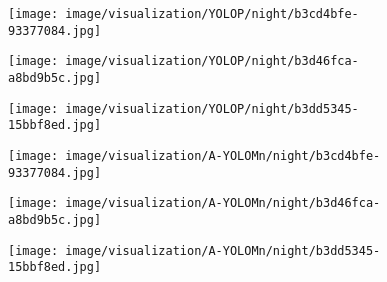 \documentclass[lettersize,journal]{IEEEtran}
\begin{document}
{\begin{figure*}[!h]
    \centering

    \begin{subfigure}[b]{0.05\textwidth}
        \centering
        \vspace{0.6cm} 
    \end{subfigure}\begin{subfigure}{0.25\textwidth}
        \centering
        \texttt{[image: image/visualization/YOLOP/night/b3cd4bfe-93377084.jpg]}
    \end{subfigure}\hspace{0.5cm}
    \begin{subfigure}{0.25\textwidth}
        \centering
        \texttt{[image: image/visualization/YOLOP/night/b3d46fca-a8bd9b5c.jpg]}
    \end{subfigure}\hspace{0.5cm}
    \begin{subfigure}{0.25\textwidth}
        \centering
        \texttt{[image: image/visualization/YOLOP/night/b3dd5345-15bbf8ed.jpg]}
    \end{subfigure}
    
    \medskip
    
    \begin{subfigure}[b]{0.05\textwidth}
        \centering
        \vspace{0.2cm}
    \end{subfigure}\begin{subfigure}{0.25\textwidth}
        \centering
        \texttt{[image: image/visualization/A-YOLOMn/night/b3cd4bfe-93377084.jpg]}
    \end{subfigure}\hspace{0.5cm}
    \begin{subfigure}{0.25\textwidth}
        \centering
        \texttt{[image: image/visualization/A-YOLOMn/night/b3d46fca-a8bd9b5c.jpg]}
    \end{subfigure}\hspace{0.5cm}
    \begin{subfigure}{0.25\textwidth}
        \centering
        \texttt{[image: image/visualization/A-YOLOMn/night/b3dd5345-15bbf8ed.jpg]}
    \end{subfigure}

    \medskip
    

\end{figure*}}
\end{document}
